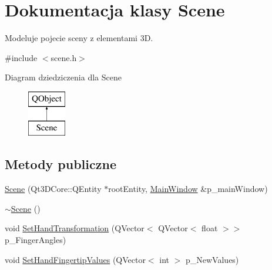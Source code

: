 \hypertarget{class_scene}{}\section{Dokumentacja klasy Scene}
\label{class_scene}


Modeluje pojecie sceny z elementami 3D.  




{\ttfamily \#include $<$scene.\+h$>$}

Diagram dziedziczenia dla Scene\begin{figure}[H]
\begin{center}
\leavevmode
\includegraphics[height=2.000000cm]{class_scene}
\end{center}
\end{figure}
\subsection*{Metody publiczne}
\begin{DoxyCompactItemize}
\item 
\hyperlink{class_scene_aa138923bf1d204f6cadbefbe7398d599}{Scene} (Qt3\+D\+Core\+::\+Q\+Entity $\ast$root\+Entity, \hyperlink{class_main_window}{Main\+Window} \&p\+\_\+main\+Window)
\item 
\hyperlink{class_scene_a3b8cec2e32546713915f8c6303c951f1}{$\sim$\+Scene} ()
\item 
void \hyperlink{class_scene_ae58cf344ad78420d37acde7984c9a4e8}{Set\+Hand\+Transformation} (Q\+Vector$<$ Q\+Vector$<$ float $>$$>$ p\+\_\+\+Finger\+Angles)
\item 
void \hyperlink{class_scene_a4dcd24690f433927c6ca75e9980afd53}{Set\+Hand\+Fingertip\+Values} (Q\+Vector$<$ int $>$ p\+\_\+\+New\+Values)
\end{DoxyCompactItemize}
